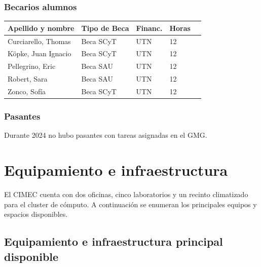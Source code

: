 \documentclass[a4paper,11pt,twoside,final,titlepage,onecolumn,openright]{report}
\begin{document}
\subsubsection{Becarios alumnos}

\begin{tabular}{l l l l r}
	\toprule
	Apellido y nombre   & Tipo de Beca & Financ. & Horas \\
	\midrule
	Curciarello, Thomas & Beca SCyT    & UTN     & 12    \\
	Köpke, Juan Ignacio & Beca SCyT    & UTN     & 12    \\
	Pellegrino, Eric    & Beca SAU     & UTN     & 12    \\
	Robert, Sara        & Beca SAU     & UTN     & 12    \\
	Zonco, Sofía        & Beca SCyT    & UTN     & 12    \\
	\bottomrule
\end{tabular}

\subsubsection{Pasantes}

Durante 2024 no hubo pasantes con tareas asignadas en el GMG.

\normalsize


\section{Equipamiento e infraestructura}

El CIMEC cuenta con dos oficinas, cinco laboratorios y un recinto climatizado para el cluster de cómputo. A continuación se enumeran los principales equipos y espacios disponibles.

\subsection{Equipamiento e infraestructura principal disponible}\label{sec:equipamiento}
\end{document}
